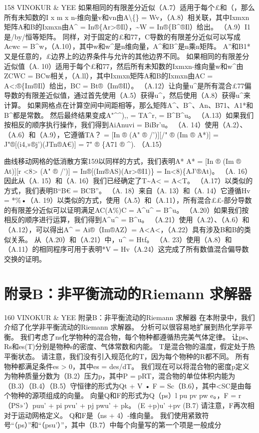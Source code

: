 \documentclass[UTF8,11pt,a4paper,openany,fontset=fandol]{ctexbook}
\begin{document}
158 VINOKUR \& YEE 如果相同的有限差分近似（A.7）适用于每个£和（，那么所有未知数的I x m x n-维向量v和vn由A\textbackslash\{\} = Wv，（A.8）相关联，其中Ixmxn矩阵A和B的Ixmxn由A\textasciicircum{} = In®\{Ar>®Il），\textasciitilde{}W = In®\{B\textasciicircum{}®Il）给出。 （A.9）I1是/by/恒等矩阵。 同样，对于固定的£和77，C导数的有限差分近似可以写成Acwc = B\textasciicircum{}w，（A.10），其中w和w\textasciicircum{}是n维向量，A\textasciicircum{}和B\textasciicircum{}是n乘n矩阵。 A''和B1*又是任意的，£边界上的边界条件与允许的其他边界不同。 如果相同的有限差分近似值（A. 10）适用于每个£和77，然后所有未知数的Ixmxn-维向量w和w\textasciicircum{}由ZCWC = BCw相关，（A.ll），其中Ixmxn矩阵A和B的Ixmxn由AC = A<:®\{Im®Il）给出，BC = Bt®（Im®Il）。 （A.12）让向量u\textasciicircum{}是所有混合£77偏导数的有限差近似值，通过首先使用（A.5）获得u\textasciicircum{}，然后使用（A.8）获得u\textasciicircum{}来计算。 如果网格点在计算空间中间距相等，那么矩阵A\textasciicircum{}、B\textasciicircum{}、An、B71、A1*和B\textasciicircum{}都是常数。 然后最终结果变成A"\textasciicircum{}\textasciicircum{}),, = TA\textasciicircum{}r, = B\textasciicircum{}B\textasciicircum{}u。 （A.13）如果我们按相反的顺序执行操作，我们得到AiAnuvi = BiBr'u。 （A. 14）使用（A.2）、（A.6）和（A.9），它遵循TA？ = [In ® (A" ® /')][/" ® (Im ® A*)] = J"®[(i4,»®j')(JTn®A€)] = 7" ® \{A71 ® \textasciicircum{}). （A.15）

曲线移动网格的低消散方案159以同样的方式，我们表明A* A* = [In ® (Im ® At)][r <8> (A" ® /')] = In®[(Im®AS)(Ar>®I1)\} = In<8)\{AJ'®At)。 （A. 16）因此从（A. 15）和（A. 16）我们已经确定了T\textasciitilde{}A< = A<T。 （A.17）以类似的方式，我们表明B“B€ = BCB”。 （A. 18）来自（A. 13）和（A. 14）它遵循Hv = *\%•（A. 19）以类似的方式，使用（A.5）和（A.11），所有混合££-部分导数的有限差分近似可以证明满足AC(A\%)C = A\textasciicircum{}u\textasciicircum{} = B\textasciicircum{}u。 （A.20）如果我们按相反的顺序进行运算，我们得到A\textasciicircum{}u\textasciicircum{} = B\textasciicircum{}u。 （A.21）使用（A.2）、（A.6）和（A.12），可以得出A\textasciicircum{} = Ai®（Im®AZ）= A<A<，（A.22）具有涉及B和B的类似关系。 从（A.20）和（A.21）中，u\textasciicircum{} = Htf。 （A. 23）使用（A.8）和（A.11）的相同程序可用于表明*V = Hv（A.24）这完成了所有数值混合偏导数交换的证明。

\section{附录B：非平衡流动的Riemann 求解器}
160 VINOKUR \& YEE 附录B：非平衡流动的Riemann 求解器 在本附录中，我们介绍了化学非平衡流动的Riemann 求解器。 分析可以很容易地扩展到热化学非平衡。 我们考虑了ns化学物种的混合物，每个物种都遵循热完美气体定律。 让ps、Rs和es(T)分别是物种s的密度、气体常数和内能。 T是混合物的温度，假定处于热平衡状态。 请注意，我们没有引入规范化的T，因为每个物种的R都不同。 所有物种都满足条件es > 0，其中es = des/dT。 我们现在可以将混合物的密度p定义为物种质量分数为（B.2）压力p，其中P = pRT，混合物的单位体积内能为（B.3）（B.4）（B.5）守恒律的形式为Qt + V • F = Sc（B.6），其中<SC是由每个物种的源项组成的向量。 向量Q和F的形式为Q（ps）l pu pv pw e。，F = r（PS»'）puu' + pi pvu' + pj pwu' + pk。 (E +p)u' +pv (B.7) 请注意，F再次相对于运动网格定义。 Q和F是（ns + 4）-维向量。 我们使用紧致符号“（ps）”和“（psu'）”，其中（B.7）中每个向量写的第一个项是一般成分
\end{document}
